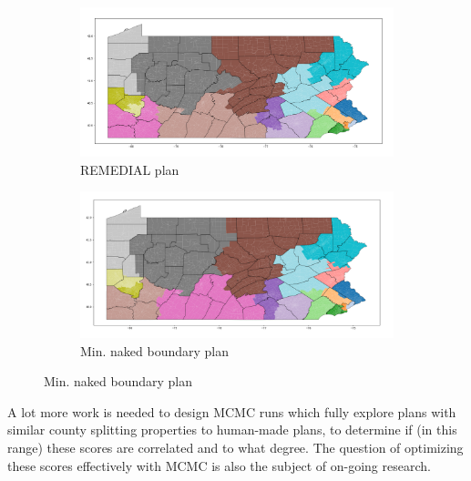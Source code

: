 \documentclass{mgggarticle}
\begin{document}
\begin{figure}[h]
	\begin{subfigure}{\textwidth}
	        \includegraphics[width=\linewidth]{figs/rem_init_bound.png}
	                 \caption{REMEDIAL plan}
	\end{subfigure}
	
	\begin{subfigure}{\textwidth}
        \includegraphics[width=\linewidth]{figs/min_naked_bound.png} 
                 \caption{Min. naked boundary plan}

	\end{subfigure}
     
\end{figure}

A lot more work is needed to design MCMC runs which fully explore plans with similar county splitting properties to human-made plans, to determine if (in this range) these scores are correlated and to what degree. The question of optimizing these scores effectively with MCMC is also the subject of on-going research.
\end{document}
